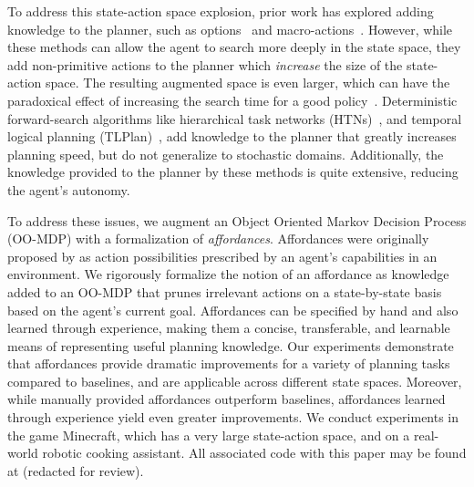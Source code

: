 \documentclass[letterpaper]{article}
\begin{document}
To address this state-action space explosion, prior work has explored
adding knowledge to the planner, such as options~\cite{sutton99} and
macro-actions~\cite{Botea:2005kx,Newton:2005vn}.  However, while these
methods can allow the agent to search more deeply in the state space, they
add non-primitive actions to the planner which {\em increase} the size of
the state-action space.  The resulting augmented space is even larger,
which can have the paradoxical effect of increasing the search time
for a good policy~\cite{Jong:2008zr}.  
Deterministic forward-search algorithms like hierarchical task
networks (HTNs)~\citep{Nau:1999:SSH:1624312.1624357}, and temporal
logical planning (TLPlan)~\citep{Bacchus95usingtemporal,Bacchus99usingtemporal},
add knowledge to the planner that greatly increases planning speed, but do
not generalize to stochastic domains. Additionally, the knowledge
provided to the planner by these methods is quite extensive, reducing the
agent's autonomy.

To address these issues, we augment an Object Oriented Markov Decision Process (OO-MDP) with a formalization of {\em
  affordances}. Affordances were originally proposed by \citet{gibson77} as
action possibilities prescribed by an agent's capabilities in an environment.
We rigorously formalize the notion of an affordance as knowledge added
to an OO-MDP that prunes irrelevant actions on a state-by-state basis based on the agent's current goal.
Affordances can be specified by hand and also learned through
experience, making them a concise, transferable, and learnable means
of representing useful planning knowledge. Our experiments demonstrate
that affordances provide dramatic improvements for a variety of
planning tasks compared to baselines, and are applicable across
different state spaces.  Moreover, while manually provided affordances
outperform baselines, affordances learned through experience yield
even greater improvements.  We conduct experiments in the game
Minecraft, which has a very large state-action space, and on a
real-world robotic cooking assistant.  All associated code with this
paper may be found at (redacted for review).

\end{document}
